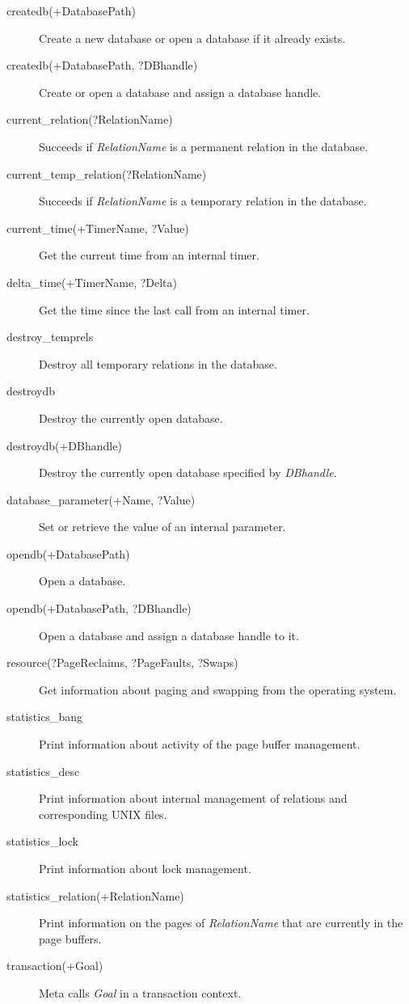 \begin{description}
\item[createdb(+DatabasePath)]{Create a new database or open a database if it already exists.}
\item[createdb(+DatabasePath, ?DBhandle)]{Create or open a database and assign a database handle.}
\item[current_relation(?RelationName)]{Succeeds if {\it RelationName} is a permanent relation in the database.}
\item[current_temp_relation(?RelationName)]{Succeeds if {\it RelationName} is a temporary relation in the database.}
\item[current_time(+TimerName, ?Value)]{Get the current time from an internal timer.}
\item[delta_time(+TimerName, ?Delta)]{Get the time since the last call from an internal timer.}
\item[destroy_temprels]{Destroy all temporary relations in the database.}
\item[destroydb]{Destroy the currently open database.}
\item[destroydb(+DBhandle)]{Destroy the currently open database specified by {\it DBhandle}.}
\item[database_parameter(+Name, ?Value)]{Set or retrieve the value of an internal parameter.}
\item[opendb(+DatabasePath)]{Open a database.}
\item[opendb(+DatabasePath, ?DBhandle)]{Open a database and assign a database handle to it.}
\item[resource(?PageReclaims, ?PageFaults, ?Swaps)]{Get information about paging and swapping from the operating system.}
\item[statistics_bang]{Print information about activity of the page buffer management.}
\item[statistics_desc]{Print information about internal management of relations and corresponding UNIX files.}
\item[statistics_lock]{Print information about lock management.}
\item[statistics_relation(+RelationName)]{Print information on the pages of {\it RelationName} that are currently in the page buffers.}
\item[transaction(+Goal)]{Meta calls {\it Goal} in a transaction context.}
\end{description}

